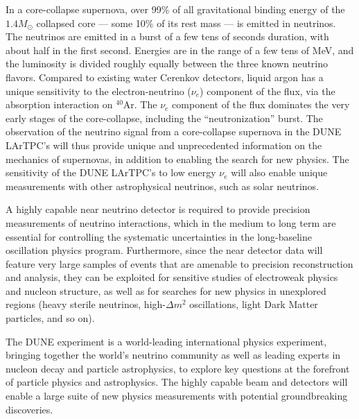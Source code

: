In a core-collapse supernova, over 99\% of all gravitational binding
energy of the $1.4 M_{\odot}$ collapsed core --- some 10\% of its rest
mass --- is emitted in neutrinos.  The neutrinos are emitted in a burst
of a few tens of seconds duration, with about half in the first
second. Energies are in the range of a few tens of MeV, and the
luminosity is divided roughly equally between the three known neutrino
flavors.  Compared to existing water Cerenkov detectors, liquid argon
has a unique sensitivity to the electron-neutrino ($\nu_e$) component
of the flux, via the absorption interaction on $^{40}$Ar. The $\nu_e$
component of the flux dominates the very early stages of the
core-collapse, including the ``neutronization'' burst. The observation
of the neutrino signal from a core-collapse supernova in the DUNE
LArTPC's will thus provide unique and unprecedented information on the
mechanics of supernovas, in addition to enabling the search for new
physics. The sensitivity of the DUNE LArTPC's to low energy $\nu_e$
will also enable unique measurements with other astrophysical
neutrinos, such as solar neutrinos.

A highly capable near neutrino detector is required to provide
precision measurements of neutrino interactions, which in the medium
to long term are essential for controlling the systematic
uncertainties in the long-baseline oscillation physics
program. Furthermore, since the near detector data will feature very
large samples of events that are amenable to precision reconstruction
and analysis, they can be exploited for sensitive studies of
electroweak physics and nucleon structure, as well as for searches for
new physics in unexplored regions (heavy sterile neutrinos,
high-$\Delta m^2$ oscillations, light Dark Matter particles, and so
on).

The DUNE experiment is a world-leading international physics
experiment, bringing together the world's neutrino community as well
as leading experts in nucleon decay and particle astrophysics, to
explore key questions at the forefront of particle physics and
astrophysics. The highly capable beam and detectors will enable a
large suite of new physics measurements with potential groundbreaking
discoveries.
